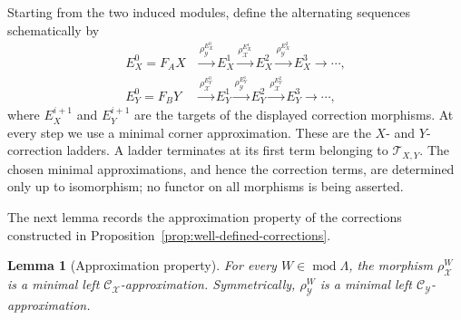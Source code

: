 \documentclass[11pt,reqno]{amsart}
\newtheorem{lemma}[theorem]{Lemma}
\theoremstyle{definition}
\theoremstyle{remark}
\newcommand{\modu}{\operatorname{mod}}
\numberwithin{equation}{section}
\begin{document}
Starting from the two induced modules, define the alternating sequences
schematically by
\begin{align*}
 E_X^0=F_AX
 &\xrightarrow{\rho_{\mathcal Y}^{E_X^0}}E_X^1
 \xrightarrow{\rho_{\mathcal X}^{E_X^1}}E_X^2
 \xrightarrow{\rho_{\mathcal Y}^{E_X^2}}E_X^3\longrightarrow\cdots,\\
 E_Y^0=F_BY
 &\xrightarrow{\rho_{\mathcal X}^{E_Y^0}}E_Y^1
 \xrightarrow{\rho_{\mathcal Y}^{E_Y^1}}E_Y^2
 \xrightarrow{\rho_{\mathcal X}^{E_Y^2}}E_Y^3\longrightarrow\cdots,
\end{align*}
where $E_X^{i+1}$ and $E_Y^{i+1}$ are the targets of the displayed
correction morphisms.  At every step we use a minimal corner approximation.
These are the $X$- and $Y$-correction ladders.  A ladder terminates at its
first term belonging to $\mathcal T_{X,Y}$.
The chosen minimal approximations, and hence the correction terms, are
determined only up to isomorphism; no functor on all morphisms is being
asserted.

The next lemma records the approximation property of the corrections
constructed in Proposition~\ref{prop:well-defined-corrections}.

\begin{lemma}[Approximation property]\label{lem:elementary-correction}
For every $W\in\modu\Lambda$, the morphism $\rho_{\mathcal X}^W$ is a
minimal left $\mathcal C_{\mathcal X}$-approximation.  Symmetrically,
$\rho_{\mathcal Y}^W$ is a minimal left
$\mathcal C_{\mathcal Y}$-approximation.
\end{lemma}
\end{document}

